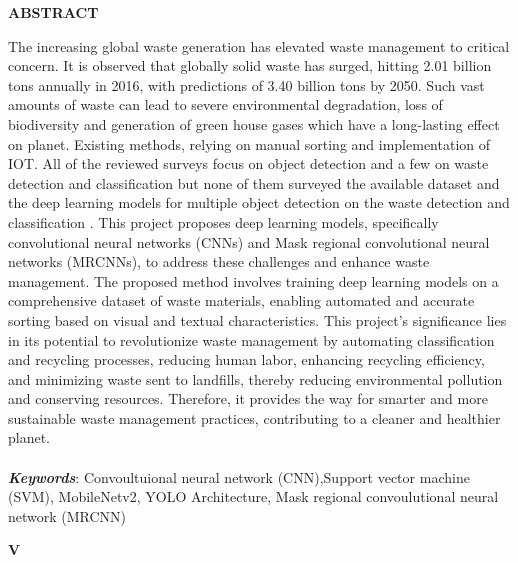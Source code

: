 \documentclass[12pt, English]{article}
\begin{document}
\begin{titlepage}

\begin{center}
\textbf{\Large ABSTRACT}\\
\end{center}

\begin{normalsize}
The increasing global waste generation has elevated waste management to critical concern. It is
observed that globally solid waste has surged, hitting 2.01 billion tons annually in 2016, with
predictions of 3.40 billion tons by 2050. Such vast amounts of waste can lead to severe
environmental degradation, loss of biodiversity and generation of green house gases which have
a long-lasting effect on planet. Existing methods, relying on manual sorting and implementation
of IOT. All of the reviewed surveys focus on object detection and a few on waste detection and classification but none of them surveyed the available dataset and the deep learning models for multiple object detection on the waste detection and classification . This project proposes deep learning models, specifically convolutional neural
networks (CNNs) and Mask regional convolutional neural networks (MRCNNs), to address these challenges and
enhance waste management. The proposed method involves training deep learning models on a
comprehensive dataset of waste materials, enabling automated and accurate sorting based on
visual and textual characteristics. This project's significance lies in its potential to revolutionize
waste management by automating classification and recycling processes, reducing human labor,
enhancing recycling efficiency, and minimizing waste sent to landfills, thereby reducing
environmental pollution and conserving resources. Therefore, it provides the way for smarter and
more sustainable waste management practices, contributing to a cleaner and healthier planet.
\\
\\
    \textit{\large \bfseries Keywords}: Convoultuional neural network (CNN),Support vector machine (SVM), MobileNetv2, YOLO Architecture, Mask regional convoulutional neural network (MRCNN)
\newline
\end{normalsize}
\begin{normalsize}
\begin{center}
\vspace*{\fill}

\textbf{V}
\end{center}
\end{normalsize}
\end{titlepage}
\end{document}
